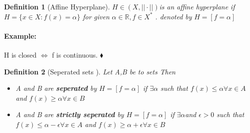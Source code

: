 \documentclass{article}
\newenvironment{example}{\paragraph{Example:}}{\hfill $\blacklozenge $}
\newtheorem{definition}{Definition}[section]
\begin{document}
\begin{definition}[Affine Hyperplane]
    $H \in (X,||\cdot||) $is an affine hyperplane if $H = \{ x \in X: f(x) =\alpha \}$ for given $\alpha \in \mathbb{R}, f \in X^{\ast}$ . denoted by $H = [f= \alpha]$ 
\end{definition}
\begin{example}
    H is closed $\iff$ f is continuous. 
\end{example}
\begin{definition}[Seperated sets ]
    Let A,B be to sets Then 
    \begin{itemize}
        \item A and B are \textbf{seperated} by $H = [f=\alpha]$ if $\exists \alpha $ such that $f(x) \leq \alpha $$ \forall x \in A$ and $f(x)\geq \alpha$$\forall x \in B$
        \item A and B are \textbf{strictly seperated} by $H = [f=\alpha]$ if $\exists \alpha $and $ \epsilon > 0$ such that $f(x) \leq \alpha - \epsilon  $$\forall x \in A$ and $f(x)\geq \alpha + \epsilon $$\forall x \in B$
    \end{itemize}
\end{definition}
\end{document}
